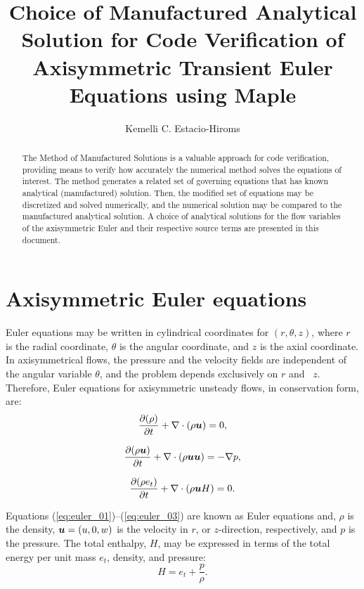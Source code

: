 \documentclass[10pt]{article}
\title{Choice of Manufactured Analytical Solution for Code Verification of Axisymmetric Transient Euler Equations using Maple}
\author{Kemelli C. Estacio-Hiroms}
\newcommand{\bv}[1]{\ensuremath{\mbox{\boldmath$ #1 $}}}
\newcommand{\Diff}[2] {\dfrac{\partial( #1)}{\partial #2}}
\begin{document}
 
\maketitle

\begin{abstract}
The Method of Manufactured Solutions is a valuable approach for code verification, providing means to verify how accurately the numerical method solves the equations of interest. The method generates a related set of governing equations that has known analytical (manufactured) solution. Then, the modified set of equations may be discretized and solved numerically, and the numerical solution may be compared to the manufactured analytical solution. A choice of analytical solutions for the flow variables of the axisymmetric Euler and their respective source terms are presented in this document.
\end{abstract}

\section{Axisymmetric Euler equations}

Euler equations may be written in cylindrical coordinates for $(r,\theta,z)$, where $r$ is the radial coordinate, $\theta$ is the angular coordinate, and $z$ is the axial coordinate. In axisymmetrical flows, the pressure and the velocity fields are independent of the angular variable $\theta$, and the problem depends exclusively on $r$ and~ $z$. Therefore, Euler equations for axisymmetric unsteady flows, in conservation form,  are:
\begin{equation}
 \label{eq:euler_01}
\Diff{\rho}{t}+ \nabla \cdot \left(\rho \bv{u}\right) = 0,
\end{equation}

\begin{equation}
 \label{eq:euler_02}
\Diff{\rho \bv{u}}{t} +\nabla\cdot\left(\rho\bv{u}\bv{u}\right) = -\nabla p,
\end{equation}

\begin{equation}
 \label{eq:euler_03}
\Diff{\rho e_t}{ t}+\nabla\cdot\left(\rho \bv{u} H\right) = 0.
\end{equation}
%


Equations (\ref{eq:euler_01})--(\ref{eq:euler_03}) are known as Euler equations and, $\rho$ is the density, $\bv{u}=(u,0,w)$ is the velocity in $r$, or $z$-direction, respectively,    and $p$ is the pressure. The total enthalpy, $H$, may be expressed in terms of the total energy per unit mass $e_t$, density, and pressure:
$$H = e_t + \dfrac{p}{\rho}.$$
\end{document}
